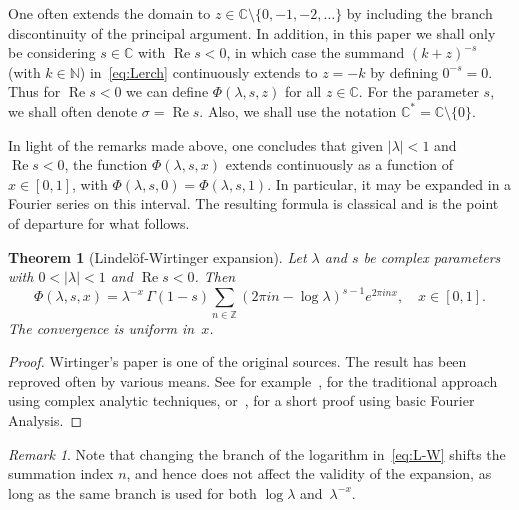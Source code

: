 \documentclass[11pt,a4paper,reqno]{amsart}
\newcommand{\C}{\mathbb{C}}
\newcommand{\N}{\mathbb{N}}
\newcommand{\Z}{\mathbb{Z}}
\renewcommand{\Re}{\operatorname{Re}}
\theoremstyle{plain}
\newtheorem{theorem}{Theorem}%
\theoremstyle{remark}
\newtheorem{remark}{Remark}
\numberwithin{equation}{section}
\begin{document}
One often extends the domain to $z \in \C\setminus \{0,-1,-2,\dots\}$ by including the branch discontinuity of the principal argument.
In addition, in this paper we shall only be considering $s \in \C$ with $\Re s < 0$, in which case the summand $(k+z)^{-s}$ (with $k \in \N$) in~\eqref{eq:Lerch} continuously extends to $z = -k$ by defining $0^{-s} = 0$. Thus for $\Re s < 0$ we can define $\Phi(\lambda,s,z)$ for all $z \in \C$.
For the parameter $s$, we shall often denote $\sigma = \Re s$.
Also, we shall use the notation $\C^{*} = \C \setminus \{0\}$. 

In light of the remarks made above, one concludes that given $|\lambda| < 1$ and $\Re s < 0$, the function $\Phi(\lambda,s,x)$ extends continuously as a function of $x \in [0,1]$, with $\Phi(\lambda,s,0) = \Phi(\lambda,s,1)$.
In particular, it may be expanded in a Fourier series on this interval. The resulting formula is classical and is the point of departure for what follows.


\begin{theorem}[Lindel\"of-Wirtinger expansion]
\label{th:L-W}
Let $\lambda$ and $s$ be complex parameters with $0<|\lambda|<1$ and $\Re s<0$. Then
%
\begin{equation}
\label{eq:L-W}
  \Phi(\lambda,s,x)
  = \lambda^{-x}\,\Gamma(1-s) \sum_{n\in\Z} (2\pi i n - \log\lambda)^{s-1}e^{2\pi i n x},
  \quad x\in[0,1].
\end{equation}
%
The convergence is uniform in~$x$.
\end{theorem}

\begin{proof}
Wirtinger's paper \cite{Wir} is one of the original sources. The result has been reproved often by various means. See for example~\cite{Bate}, for the traditional approach using complex analytic techniques, or~\cite{NRV-JAT2}, for a short proof using basic Fourier Analysis.
\end{proof}

\begin{remark}
Note that changing the branch of the logarithm in~\eqref{eq:L-W} shifts the summation index $n$, and hence does not affect the validity of the expansion, as long as the same branch is used for both $\log\lambda$ and~$\lambda^{-x}$.
\end{remark}
\end{document}

